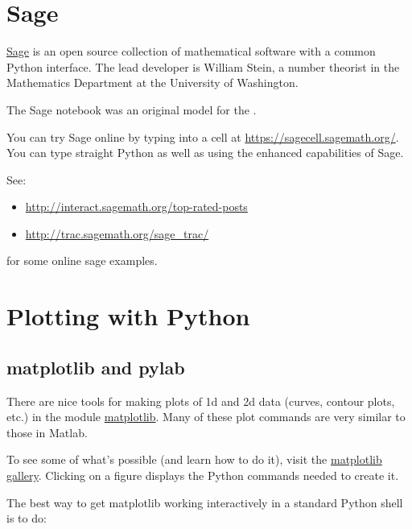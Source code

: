 \documentclass[letterpaper,10pt,english]{sphinxmanual}
\begin{document}
\section{Sage}
\label{sage:sage}\label{sage:sagemath}\label{sage::doc}
\href{http://sagemath.org}{Sage} is an open source collection of mathematical
software with a common Python interface.  The lead developer is William
Stein, a number theorist in the Mathematics Department at the University of
Washington.

The Sage notebook was an original model for the {\hyperref[ipython_notebook:ipython\string-notebook]{}}.

You can try Sage online by typing into a cell at
\url{https://sagecell.sagemath.org/}.  You can type straight
Python as well as using the enhanced capabilities of Sage.

See:
\begin{itemize}
\item {} 
\url{http://interact.sagemath.org/top-rated-posts}

\item {} 
\url{http://trac.sagemath.org/sage\_trac/}

\end{itemize}

for some online sage examples.


\section{Plotting with Python}
\label{python_plotting:plotting-with-python}\label{python_plotting::doc}\label{python_plotting:python-plotting}

\subsection{matplotlib and pylab}
\label{python_plotting:matplotlib-and-pylab}\label{python_plotting:pylab}
There are nice tools for making plots of 1d and 2d data (curves, contour
plots, etc.) in the module
\href{http://matplotlib.sourceforge.net/}{matplotlib}.
Many of these plot commands are very similar to those in Matlab.

To see some of what's possible (and learn how to do it), visit the
\href{http://matplotlib.sourceforge.net/gallery.html}{matplotlib gallery}.
Clicking on a figure displays the Python commands needed to create it.

The best way to get matplotlib working interactively in a standard Python
shell is to do:
\end{document}
